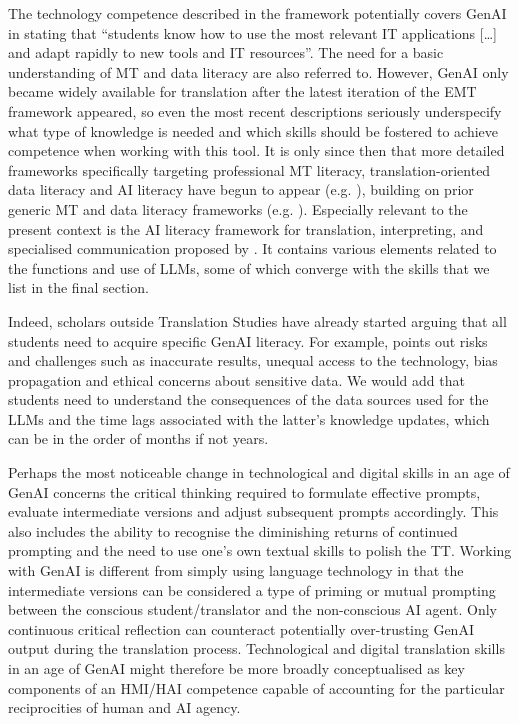 \documentclass[output=paper]{langscibook}
\begin{document}
The technology competence described in the \citet[9]{emt_european_2022} framework potentially covers GenAI in stating that “students know how to use the most relevant IT applications […] and adapt rapidly to new tools and IT resources”. The need for a basic understanding of MT and data literacy are also referred to. However, GenAI only became widely available for translation after the latest iteration of the EMT framework appeared, so even the most recent descriptions seriously underspecify what type of knowledge is needed and which skills should be fostered to achieve competence when working with this tool. It is only since then that more detailed frameworks specifically targeting professional MT literacy, translation-oriented data literacy and AI literacy have begun to appear (e.g. \citealt{kruger24_AI_literacy_framework,kruegerhackenbuchner_2024}), building on prior generic MT and data literacy frameworks (e.g. \citealt{bowkerbuitrago19}).  Especially relevant to the present context is the AI literacy framework for translation, interpreting, and specialised communication proposed by \citet{kruger24_AI_literacy_framework}. It contains various elements related to the functions and use of LLMs, some of which converge with the skills that we list in the final section.

Indeed, scholars outside Translation Studies have already started arguing that all students need to acquire specific GenAI literacy. For example, \citet{pretorius_fostering_2023} points out risks and challenges such as inaccurate results, unequal access to the technology, bias propagation and ethical concerns about sensitive data. We would add that students need to understand the consequences of the data sources used for the LLMs and the time lags associated with the latter’s knowledge updates, which can be in the order of months if not years.

Perhaps the most noticeable change in technological and digital skills in an age of GenAI concerns the critical thinking required to formulate effective prompts, evaluate intermediate versions and adjust subsequent prompts accordingly. This also includes the ability to recognise the diminishing returns of continued prompting and the need to use one’s own textual skills to polish the TT. Working with GenAI is different from simply using language technology in that the intermediate versions can be considered a type of priming or mutual prompting between the conscious student/translator and the non-conscious AI agent. Only continuous critical reflection can counteract potentially over-trusting GenAI output during the translation process. Technological and digital translation skills in an age of GenAI might therefore be more broadly conceptualised as key components of an HMI/HAI competence capable of accounting for the particular reciprocities of human and AI agency.
\end{document}
